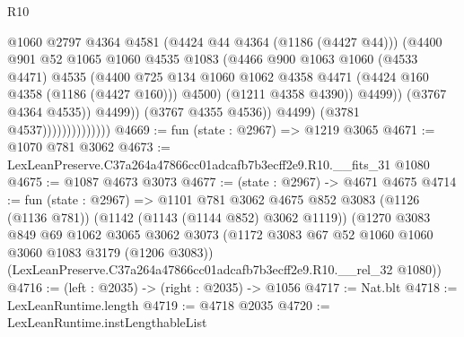 \begin{lexlean}{R10}
\begin{coremodule}
                                          @1060
                                          @2797
                                          @4364
                                          @4581
                                          (@4424 @44 @4364 (@1186 (@4427 @44)))
                                          (@4400
                                            @901
                                            @52
                                            @1065
                                            @1060
                                            @4535
                                            @1083
                                            (@4466
                                              @900
                                              @1063
                                              @1060
                                              (@4533 @4471)
                                              @4535
                                              (@4400
                                                @725
                                                @134
                                                @1060
                                                @1062
                                                @4358
                                                @4471
                                                (@4424 @160 @4358 (@1186 (@4427 @160)))
                                                @4500)
                                              (@1211 @4358 @4390))
                                            @4499))
                                        (@3767 @4364 @4535))
                                      @4499))
                                  (@3767 @4355 @4536))
                                @4499)
                              (@3781 @4537))))))))))))))
@4669 := fun (state : @2967) => @1219 @3065
@4671 := @1070 @781 @3062
@4673 := LexLeanPreserve.C37a264a47866cc01adcafb7b3ecff2e9.R10.__fits_31 @1080
@4675 := @1087 @4673 @3073
@4677 := (state : @2967) -> @4671 @4675
@4714 := fun (state : @2967) =>
  @1101
    @781
    @3062
    @4675
    @852
    @3083
    (@1126 (@1136 @781))
    (@1142 (@1143 (@1144 @852) @3062 @1119))
    (@1270
      @3083
      @849
      @69
      @1062
      @3065
      @3062
      @3073
      (@1172 @3083 @67 @52 @1060 @1060 @3060 @1083 @3179 (@1206 @3083))
      (LexLeanPreserve.C37a264a47866cc01adcafb7b3ecff2e9.R10.__rel_32 @1080))
@4716 := (left : @2035) -> (right : @2035) -> @1056
@4717 := Nat.blt
@4718 := LexLeanRuntime.length
@4719 := @4718 @2035
@4720 := LexLeanRuntime.instLengthableList

\end{coremodule}
\end{lexlean}
